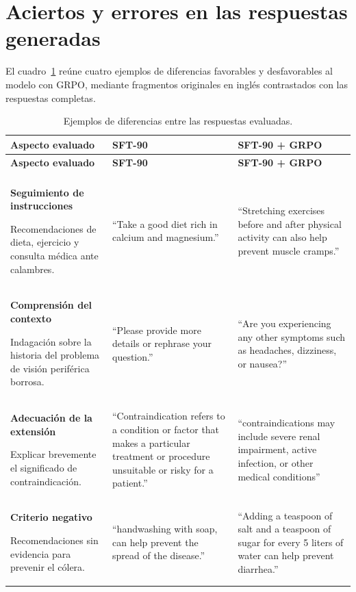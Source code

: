 \section{Aciertos y errores en las respuestas generadas}
\label{sec:resultados-cualitativos}

El cuadro~\ref{tab:resultados-ejemplos} reúne cuatro ejemplos de diferencias favorables y desfavorables al modelo con GRPO, mediante fragmentos originales en inglés contrastados con las respuestas completas.

\begingroup
\renewcommand{\tablename}{Cuadro}
\singlespacing
\setlength{\parskip}{3pt}
\setlength{\tabcolsep}{4pt}
\begin{longtable}{|>{\centering\arraybackslash}p{}|>{\centering\arraybackslash}p{}|>{\centering\arraybackslash}p{}|}
\caption{Ejemplos de diferencias entre las respuestas evaluadas.}
\label{tab:resultados-ejemplos}\\
\hline
\textbf{Aspecto evaluado} & \textbf{SFT-90} & \textbf{SFT-90 + GRPO} \\
\hline
\endfirsthead
\hline
\textbf{Aspecto evaluado} & \textbf{SFT-90} & \textbf{SFT-90 + GRPO} \\
\hline
\endhead
\hline
\multicolumn{3}{|c|}{Continúa en la página siguiente.} \\
\hline
\endfoot
\hline
\endlastfoot
\textbf{Seguimiento de instrucciones}\par
Recomendaciones de dieta, ejercicio y consulta médica ante calambres.
&
\enquote{Take a good diet rich in calcium and magnesium.}
&
\enquote{Stretching exercises before and after physical activity can also help prevent muscle cramps.}
\\[0.3\baselineskip]
\hline
\textbf{Comprensión del contexto}\par
Indagación sobre la historia del problema de visión periférica borrosa.
&
\enquote{Please provide more details or rephrase your question.}
&
\enquote{Are you experiencing any other symptoms such as headaches, dizziness, or nausea?}
\\[0.3\baselineskip]
\hline
\textbf{Adecuación de la extensión}\par
Explicar brevemente el significado de contraindicación.
&
\enquote{Contraindication refers to a condition or factor that makes a particular treatment or procedure unsuitable or risky for a patient.}
&
\enquote{contraindications may include severe renal impairment, active infection, or other medical conditions}
\\[0.3\baselineskip]
\hline
\textbf{Criterio negativo}\par
Recomendaciones sin evidencia para prevenir el cólera.
&
\enquote{handwashing with soap, can help prevent the spread of the disease.}
&
\enquote{Adding a teaspoon of salt and a teaspoon of sugar for every 5 liters of water can help prevent diarrhea.}
\\
\end{longtable}
\endgroup

